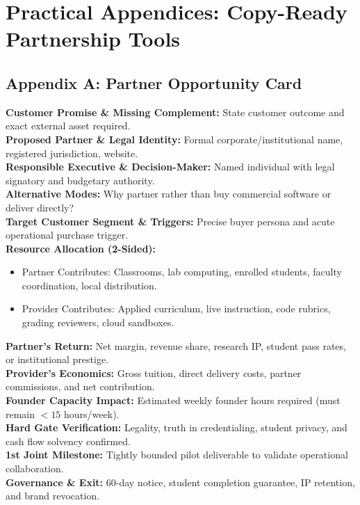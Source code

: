 \section*{Practical Appendices: Copy-Ready Partnership Tools}
\label{sec:ch30_practical_appendices}

\subsection*{Appendix A: Partner Opportunity Card}
\label{sec:app_partner_opportunity_card}

\begin{tcolorbox}[colback=white,colframe=BayesSecondary,title=\textbf{Partner Opportunity Evaluation Card}]
\small
\textbf{Customer Promise \& Missing Complement:} State customer outcome and exact external asset required. \\
\textbf{Proposed Partner \& Legal Identity:} Formal corporate/institutional name, registered jurisdiction, website. \\
\textbf{Responsible Executive \& Decision-Maker:} Named individual with legal signatory and budgetary authority. \\
\textbf{Alternative Modes:} Why partner rather than buy commercial software or deliver directly? \\
\textbf{Target Customer Segment \& Triggers:} Precise buyer persona and acute operational purchase trigger. \\
\textbf{Resource Allocation (2-Sided):}
\begin{itemize}
\item Partner Contributes: Classrooms, lab computing, enrolled students, faculty coordination, local distribution.
\item Provider Contributes: Applied curriculum, live instruction, code rubrics, grading reviewers, cloud sandboxes.
\end{itemize}
\textbf{Partner's Return:} Net margin, revenue share, research IP, student pass rates, or institutional prestige. \\
\textbf{Provider's Economics:} Gross tuition, direct delivery costs, partner commissions, and net contribution. \\
\textbf{Founder Capacity Impact:} Estimated weekly founder hours required (must remain $<15$ hours/week). \\
\textbf{Hard Gate Verification:} Legality, truth in credentialing, student privacy, and cash flow solvency confirmed. \\
\textbf{1st Joint Milestone:} Tightly bounded pilot deliverable to validate operational collaboration. \\
\textbf{Governance \& Exit:} 60-day notice, student completion guarantee, IP retention, and brand revocation.
\end{tcolorbox}

